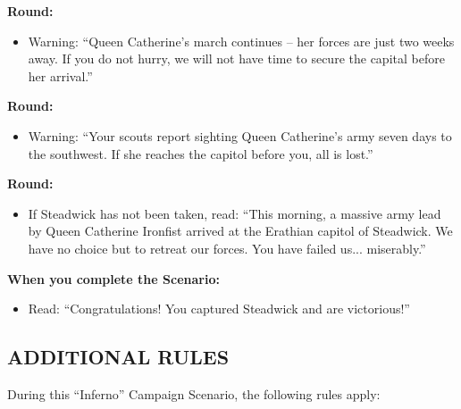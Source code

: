 \begin{multicols*}{2}
\textbf{ Round:}
\begin{itemize}
  \item Warning: ``Queen Catherine's march continues -- her forces are just two weeks away. If you do not hurry,
    we will not have time to secure the capital before her arrival.''
\end{itemize}

\textbf{ Round:}
\begin{itemize}
  \item Warning: ``Your scouts report sighting Queen Catherine's army seven days to the southwest. If she
    reaches the capitol before you, all is lost.''
\end{itemize}

\textbf{ Round:}
\begin{itemize}
  \item If Steadwick has not been taken, read: ``This morning, a massive army lead by Queen Catherine
    Ironfist arrived at the Erathian capitol of Steadwick. We have no choice but to retreat our forces.
    You have failed us... miserably.''
\end{itemize}

\textbf{When you complete the Scenario:}
\begin{itemize}
  \item Read: ``Congratulations! You captured Steadwick and are victorious!''
\end{itemize}

\subsection*{\MakeUppercase{Additional Rules}}

During this ``Inferno'' Campaign Scenario, the following rules apply:


\end{multicols*}
